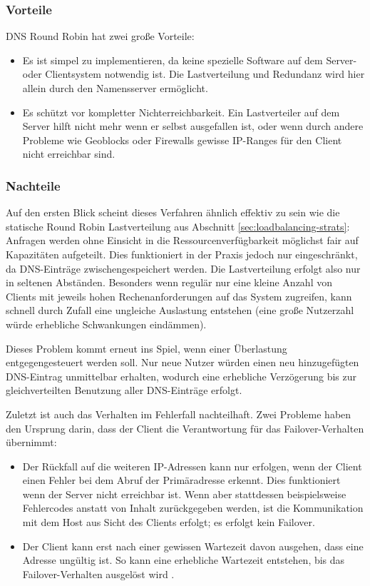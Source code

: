 \subsubsection{Vorteile}
DNS Round Robin hat zwei große Vorteile:
\begin{itemize}
	\item Es ist simpel zu implementieren, da keine spezielle Software auf dem Server- oder Clientsystem notwendig ist. Die Lastverteilung und Redundanz wird hier allein durch den Namensserver ermöglicht.
	\item Es schützt vor kompletter Nichterreichbarkeit. Ein Lastverteiler auf dem Server hilft nicht mehr wenn er selbst ausgefallen ist, oder wenn durch andere Probleme wie Geoblocks oder Firewalls gewisse IP-Ranges für den Client nicht erreichbar sind.
\end{itemize}

\subsubsection{Nachteile}
Auf den ersten Blick scheint dieses Verfahren ähnlich effektiv zu sein wie die statische Round Robin Lastverteilung aus Abschnitt \ref{sec:loadbalancing-strats}: Anfragen werden ohne Einsicht in die Ressourcenverfügbarkeit möglichst fair auf Kapazitäten aufgeteilt. Dies funktioniert in der Praxis jedoch nur eingeschränkt, da DNS-Einträge zwischengespeichert werden. Die Lastverteilung erfolgt also nur in seltenen Abständen. Besonders wenn regulär nur eine kleine Anzahl von Clients mit jeweils hohen Rechenanforderungen auf das System zugreifen, kann schnell durch Zufall eine ungleiche Auslastung entstehen (eine große Nutzerzahl würde erhebliche Schwankungen eindämmen).

Dieses Problem kommt erneut ins Spiel, wenn einer Überlastung entgegengesteuert werden soll. Nur neue Nutzer würden einen neu hinzugefügten DNS-Eintrag unmittelbar erhalten, wodurch eine erhebliche Verzögerung bis zur gleichverteilten Benutzung aller DNS-Einträge erfolgt.

Zuletzt ist auch das Verhalten im Fehlerfall nachteilhaft. Zwei Probleme haben den Ursprung darin, dass der Client die Verantwortung für das Failover-Verhalten übernimmt:
\begin{itemize}
	\item Der Rückfall auf die weiteren IP-Adressen kann nur erfolgen, wenn der Client einen Fehler bei dem Abruf der Primäradresse erkennt. Dies funktioniert wenn der Server nicht erreichbar ist. Wenn aber stattdessen beispielsweise Fehlercodes anstatt von Inhalt zurückgegeben werden, ist die Kommunikation mit dem Host aus Sicht des Clients erfolgt; es erfolgt kein Failover.
	\item Der Client kann erst nach einer gewissen Wartezeit davon ausgehen, dass eine Adresse ungültig ist. So kann eine erhebliche Wartezeit entstehen, bis das Failover-Verhalten ausgelöst wird \cite{so-dns-slow}.
	
	
	
	
	
	
	
	
\end{itemize}